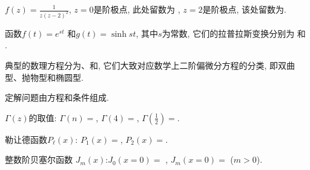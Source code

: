 \documentclass{njustexam}
\begin{document}
\begin{problem}
 $ f(z) = \frac{1}{z( z- 2)^2}$,  $z=0$是阶极点, 此处留数为 , 
 $z=2$是阶极点,  该处留数为. 
\end{problem}


\begin{problem}
函数$f(t) = e^{st}$ 和$g(t)=\sinh{st}$, 其中$s$为常数, 它们的拉普拉斯变换分别为 和
.
\end{problem}

\begin{problem}
  典型的数理方程分为、和, 
  它们大致对应数学上二阶偏微分方程的分类, 即双曲型、抛物型和椭圆型. 
  \end{problem}

\begin{problem}
  定解问题由方程和条件组成. %
\end{problem}

\begin{problem}
$\Gamma(z)$的取值: $\Gamma(n)=$,  
$\Gamma(4)=$, 
 $\Gamma(\frac{1}{2})= $\fillout{$\sqrt{\pi}$}.
\end{problem}

\begin{problem}
  勒让德函数$P_\ell(x)$:
  $P_1(x) = $,  $P_2(x) = $. 
  \end{problem}


\begin{problem}
整数阶贝塞尔函数 $J_m(x)$:$J_0(x=0)=$ , $ J_m (x=0)=$ ($m>0$).
\end{problem}
\end{document}
